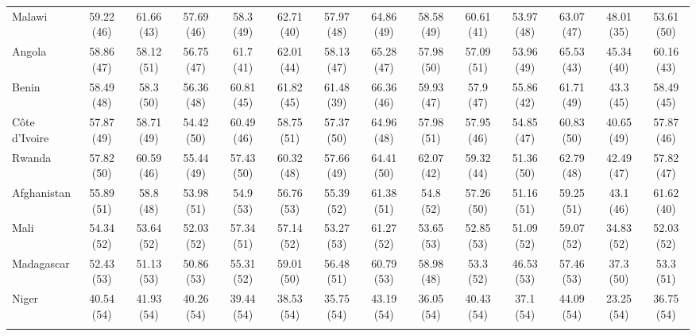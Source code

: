 \begin{longtable}{lccccccccccccc}
Malawi & 59.22 (46) & 61.66 (43) & 57.69 (46) & 58.3 (49) & 62.71 (40) & 57.97 (48) & 64.86 (49) & 58.58 (49) & 60.61 (41) & 53.97 (48) & 63.07 (47) & 48.01 (35) & 53.61 (50) \\ 
Angola & 58.86 (47) & 58.12 (51) & 56.75 (47) & 61.7 (41) & 62.01 (44) & 58.13 (47) & 65.28 (47) & 57.98 (50) & 57.09 (51) & 53.96 (49) & 65.53 (43) & 45.34 (40) & 60.16 (43) \\ 
Benin & 58.49 (48) & 58.3 (50) & 56.36 (48) & 60.81 (45) & 61.82 (45) & 61.48 (39) & 66.36 (46) & 59.93 (47) & 57.9 (47) & 55.86 (42) & 61.71 (49) & 43.3 (45) & 58.49 (45) \\ 
Côte d'Ivoire & 57.87 (49) & 58.71 (49) & 54.42 (50) & 60.49 (46) & 58.75 (51) & 57.37 (50) & 64.96 (48) & 57.98 (51) & 57.95 (46) & 54.85 (47) & 60.83 (50) & 40.65 (49) & 57.87 (46) \\ 
Rwanda & 57.82 (50) & 60.59 (46) & 55.44 (49) & 57.43 (50) & 60.32 (48) & 57.66 (49) & 64.41 (50) & 62.07 (42) & 59.32 (44) & 51.36 (50) & 62.79 (48) & 42.49 (47) & 57.82 (47) \\ 
Afghanistan & 55.89 (51) & 58.8 (48) & 53.98 (51) & 54.9 (53) & 56.76 (53) & 55.39 (52) & 61.38 (51) & 54.8 (52) & 57.26 (50) & 51.16 (51) & 59.25 (51) & 43.1 (46) & 61.62 (40) \\ 
Mali & 54.34 (52) & 53.64 (52) & 52.03 (52) & 57.34 (51) & 57.14 (52) & 53.27 (53) & 61.27 (52) & 53.65 (53) & 52.85 (53) & 51.09 (52) & 59.07 (52) & 34.83 (52) & 52.03 (52) \\ 
Madagascar & 52.43 (53) & 51.13 (53) & 50.86 (53) & 55.31 (52) & 59.01 (50) & 56.48 (51) & 60.79 (53) & 58.98 (48) & 53.3 (52) & 46.53 (53) & 57.46 (53) & 37.3 (50) & 53.3 (51) \\ 
Niger & 40.54 (54) & 41.93 (54) & 40.26 (54) & 39.44 (54) & 38.53 (54) & 35.75 (54) & 43.19 (54) & 36.05 (54) & 40.43 (54) & 37.1 (54) & 44.09 (54) & 23.25 (54) & 36.75 (54) \\ 
\hline \\[-1.8ex]
\end{longtable}
\endgroup
